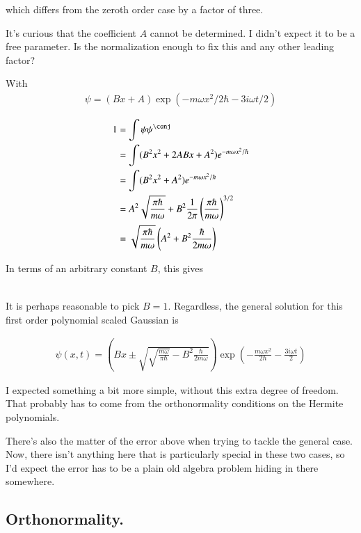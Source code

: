 which differs from the zeroth order case by a factor of three.

It's curious that the coefficient $A$ cannot be determined.  I didn't expect it to be a free parameter.  Is the normalization enough to
fix this and any other leading factor?

With
\begin{align*}
\psi = (B x + A) \exp( - m \omega x^2/2 \hbar - 3 i \omega t / 2 )
\end{align*}

\begin{align*}
1 
&= \int \psi\psi^\conj \\
&= \int (B^2 x^2 + 2 A B x + A^2 ) e^{- m \omega x^2/ \hbar } \\
&= \int (B^2 x^2 + A^2 ) e^{- m \omega x^2/ \hbar } \\
&= A^2 \sqrt{\frac{\pi \hbar}{m \omega}} + B^2 \inv{2 \pi} \left( \frac{\pi \hbar}{ m \omega} \right)^{3/2} \\
&= \sqrt{\frac{\pi \hbar}{m \omega}} \left( A^2 + B^2 \frac{ \hbar}{ 2 m \omega} \right) \\
\end{align*}

In terms of an arbitrary constant $B$, this gives

\begin{align*}
\end{align*}

It is perhaps reasonable to pick $B=1$.  Regardless, the general solution for this first order polynomial scaled Gaussian is

\begin{align*}
\psi(x,t) = 
\left(B x \pm \sqrt{\sqrt{\frac{m \omega}{\pi \hbar}} - B^2 \frac{ \hbar}{ 2 m \omega} }\right) \exp\left( - \frac{m \omega x^2}{2 \hbar} - \frac{3 i \omega t }{ 2} \right)
\end{align*}

I expected something a bit more simple, without this extra degree of freedom.  That probably has to come from the orthonormality conditions on the
Hermite polynomials.

There's also the matter of the error above when trying to tackle the general case.  Now, there isn't anything here that is particularly special in these two
cases, so I'd expect the error has to be a plain old algebra problem 
hiding in there somewhere.

\subsection{Orthonormality. }

